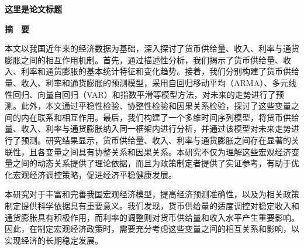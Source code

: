 \thispagestyle{empty}   %

\begin{center}
    \textbf{\fontsize{20}{1.5}这里是论文标题}

    \textbf{摘　要}
\end{center}


     本文以我国近年来的经济数据为基础，深入探讨了货币供给量、收入、利率与通货膨胀之间的相互作用机制。首先，通过描述性分析，我们揭示了货币供给量、收入、利率和通货膨胀的基本统计特征和变化趋势。接着，我们分别构建了货币供给量、收入、利率和通货膨胀的预测模型，采用自回归移动平均（ARMA）、多元线性回归、向量自回归（VAR）和指数平滑等模型方法，对未来的走势进行了预测。此外，本文通过平稳性检验、协整性检验和因果关系检验，探讨了这些变量之间的内在联系和相互作用。最后，我们构建了一个多维时间序列模型，将货币供给量、收入、利率与通货膨胀纳入同一框架内进行分析，并通过该模型对未来走势进行了预测。研究结果显示，货币供给量、收入、利率与通货膨胀之间存在显著的关联性，且各变量之间具有协整关系和因果关系。本研究不仅为理解这些宏观经济变量之间的动态关系提供了理论依据，而且为政策制定者提供了实证参考，有助于优化宏观经济调控策略，促进经济平稳健康发展。

     本研究对于丰富和完善我国宏观经济模型，提高经济预测准确性，以及为相关政策制定提供科学依据具有重要意义。我们发现，货币供给量的适度调控对稳定收入和通货膨胀具有积极作用，而利率的调整则对货币供给量和收入水平产生重要影响。因此，在制定宏观经济政策时，需要充分考虑这些变量之间的相互关系和影响，以实现经济的长期稳定发展。\newline \newline





